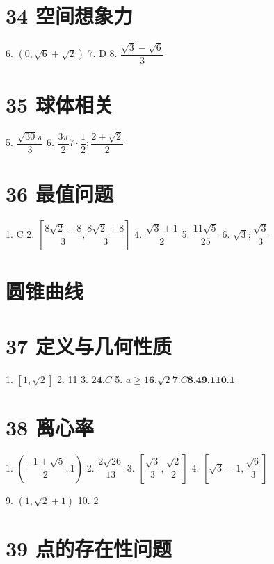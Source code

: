 \documentclass[10pt]{article}
\begin{document}
\section*{34 空间想象力}

6. $\left( {0,\sqrt{6} + \sqrt{2}}\right)$ 7. D 8. $\dfrac{\sqrt{3} - \sqrt{6}}{3}$

\section*{35 球体相关}

5. $\dfrac{\sqrt{30}\pi }{3}$ 6. $\dfrac{3\pi }{2}7 \cdot  \dfrac{1}{2};\dfrac{2 + \sqrt{2}}{2}$

\section*{36 最值问题}

1. C 2. $\left\lbrack  {\dfrac{8\sqrt{2} - 8}{3},\dfrac{8\sqrt{2} + 8}{3}}\right\rbrack$ 4. $\dfrac{\sqrt{3} + 1}{2}$ 5. $\dfrac{{11}\sqrt{5}}{25}$ 6. $\sqrt{3};\dfrac{\sqrt{3}}{3}$

\section*{圆锥曲线}

\section*{37 定义与几何性质}

1. $\left\lbrack  {1,\sqrt{2}}\right\rbrack$ 2. 11 3. $2\mathbf{4}.{C}$ 5. $a \geq  1\mathbf{6}.\sqrt{2}\mathbf{7}.{C}\mathbf{8}.\mathbf{4}\mathbf{9}.\mathbf{1}\mathbf{{10}}.\mathbf{1}$

\section*{38 离心率}

1. $\left( {\dfrac{-1 + \sqrt{5}}{2},1}\right)$ 2. $\dfrac{2\sqrt{26}}{13}$ 3. $\left\lbrack  {\dfrac{\sqrt{3}}{3},\dfrac{\sqrt{2}}{2}}\right\rbrack$ 4. $\left\lbrack  {\sqrt{3} - 1,\dfrac{\sqrt{6}}{3}}\right\rbrack$

9. $\left( {1,\sqrt{2} + 1}\right)$ 10. 2

\section*{39 点的存在性问题}
\end{document}
